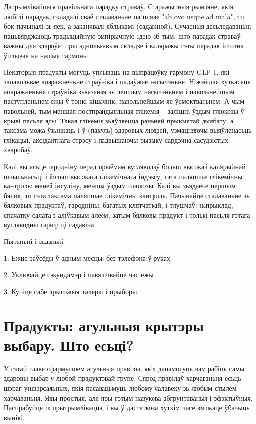 Датрымлівайцеся правільнага парадку страваў. Старажытныя рымляне, якія любілі парадак, складалі сваё сталаваньне па пляне "ab ovo usque ad mala", то бок пачыналі зь яек, а заканчвалі яблыкамі (садавіной). Сучасныя дасьледаваньні пацьвярджаюць традыцыйную эмпірычную ідэю аб тым, што парадак страваў важны для здароўя: пры аднолькавым складзе і каляражы гэты парадак істотна ўплывае на нашыя гармоны.

Некаторыя прадукты могуць уплываць на выпрацоўку гармону GLP-1, які запавольвае апаражненьне страўніка і падаўжае насычэньне. Ніжэйшая хуткасьць апаражненьня страўніка зьвязаная зь лепшым насычэньнем і павольнейшым паступленьнем ежы ў тонкі кішачнік, павольнейшым яе ўсмоктваньнем. А чым павольней, тым меншая постпрандыяльная глікемія – залішні ўздым глюкозы ў крыві пасьля яды. Такая глікемія зьяўляецца раньняй прыкметай дыябэту, а таксама можа ўзьнікаць і ў (пакуль) здаровых людзей, узмацняючы выяўленасьць глікацыі, аксідантнага стрэсу і падвышаючы рызыку сардэчна-сасудзістых хваробаў.

Калі вы ясьце гародніну перад прыёмам вугляводаў больш высокай калярыйнай шчыльнасьці і больш высокага глікемічнага індэксу, гэта паляпшае глікемічны кантроль: меней інсуліну, меншы ўздым глюкозы. Калі вы зьядаеце першым бялок, то гэта таксама паляпшае глікемічны кантроль. Пачынайце сталаваньне зь бялковых прадуктаў, гародніны, багатых клятчаткай, і тлушчаў: напрыклад, спачатку салата з аліўкавым алеем, затым бялковы прадукт і толькі пасьля гэтага вугляводны гарнір ці садавіна.

Пытаньні і заданьні

1. Ежце заўсёды ў адным месцы, без тэлефона ў руках.

2. Уключайце сэкундамэр і павялічвайце час ежы.

3. Купіце сабе прыгожыя талеркі і прыборы.


\section{Прадукты: агульныя крытэры выбару. Што есьці?}

У гэтай главе сфармулюем агульныя правілы, якія дапамогуць вам рабіць самы здаровы выбар у любой прадуктовай групе. Сярод правілаў харчаваньня ёсьць шэраг унівэрсальных, якія пасавацьмуць любому чалавеку зь любым стылем харчаваньня. Яны простыя, але пры гэтым навукова абгрунтаваныя і эфэктыўныя. Паспрабуйце іх прытрымлівацца, і вы ў дастаткова хуткім часе зможаце ўбачыць вынікі.

